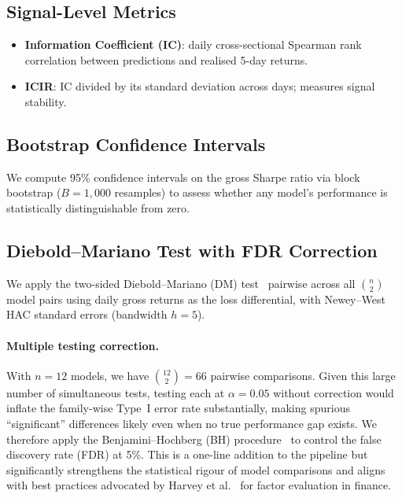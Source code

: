 \documentclass[preprint,review,12pt]{elsarticle}
\begin{document}
\subsection{Signal-Level Metrics}

\begin{itemize}[leftmargin=1.4em]
  \item \textbf{Information Coefficient (IC)}: daily cross-sectional Spearman rank correlation between predictions and realised 5-day returns.
  \item \textbf{ICIR}: IC divided by its standard deviation across days; measures signal stability.
\end{itemize}

\subsection{Bootstrap Confidence Intervals}

We compute 95\% confidence intervals on the gross Sharpe ratio via block bootstrap ($B=1{,}000$ resamples) to assess whether any model's performance is statistically distinguishable from zero.

\subsection{Diebold--Mariano Test with FDR Correction}

We apply the two-sided Diebold--Mariano (DM) test~\citep{ref_dm} pairwise across all $\binom{n}{2}$ model pairs using daily gross returns as the loss differential, with Newey--West HAC standard errors (bandwidth $h=5$).

\paragraph{Multiple testing correction.}
With $n=12$ models, we have $\binom{12}{2} = 66$ pairwise comparisons.
Given this large number of simultaneous tests, testing each at $\alpha=0.05$ without correction would inflate the family-wise Type~I error rate substantially, making spurious ``significant'' differences likely even when no true performance gap exists.
We therefore apply the Benjamini--Hochberg (BH) procedure~\citep{ref_bh} to control the false discovery rate (FDR) at 5\%.
This is a one-line addition to the pipeline but significantly strengthens the statistical rigour of model comparisons and aligns with best practices advocated by Harvey et al.~\citep{ref_harvey} for factor evaluation in finance.
\end{document}
